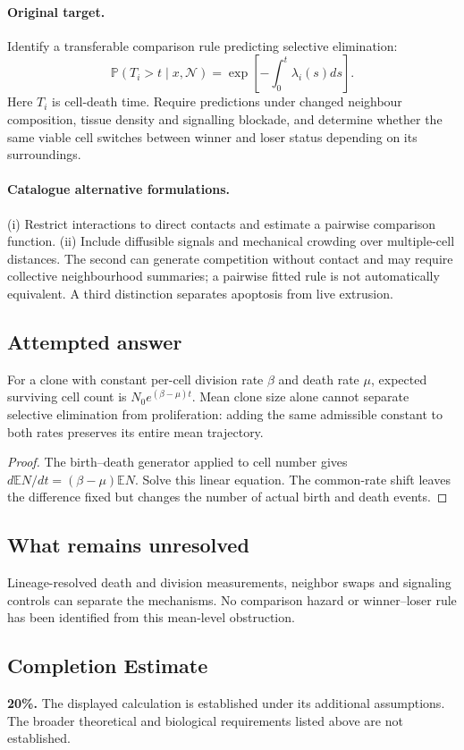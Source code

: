 \documentclass[11pt]{article}
\begin{document}
\paragraph{Original target.}
Identify a transferable comparison rule predicting selective elimination:
\[
\mathbb{P}(T_i>t\mid x,\mathcal N)=\exp\!\left[-\int_0^t\lambda_i(s)ds\right].
\]
Here $T_i$ is cell-death time. Require predictions under changed neighbour composition, tissue density and signalling blockade, and determine whether the same viable cell switches between winner and loser status depending on its surroundings.
\paragraph{Catalogue alternative formulations.}
(i) Restrict interactions to direct contacts and estimate a pairwise comparison function. (ii) Include diffusible signals and mechanical crowding over multiple-cell distances. The second can generate competition without contact and may require collective neighbourhood summaries; a pairwise fitted rule is not automatically equivalent. A third distinction separates apoptosis from live extrusion.
\subsection{Attempted answer}
\begin{proposition}
For a clone with constant per-cell division rate $\beta$ and death rate $\mu$, expected surviving cell count is $N_0e^{(\beta-\mu)t}$. Mean clone size alone cannot separate selective elimination from proliferation: adding the same admissible constant to both rates preserves its entire mean trajectory.
\end{proposition}
\begin{proof}
The birth--death generator applied to cell number gives $d\mathbb{E} N/dt=(\beta-\mu)\mathbb{E} N$. Solve this linear equation. The common-rate shift leaves the difference fixed but changes the number of actual birth and death events.
\end{proof}
\subsection{What remains unresolved}
Lineage-resolved death and division measurements, neighbor swaps and signaling controls can separate the mechanisms. No comparison hazard or winner--loser rule has been identified from this mean-level obstruction.
\subsection{Completion Estimate}
\textbf{20\%.} The displayed calculation is established under its additional assumptions. The broader theoretical and biological requirements listed above are not established.
\end{document}
